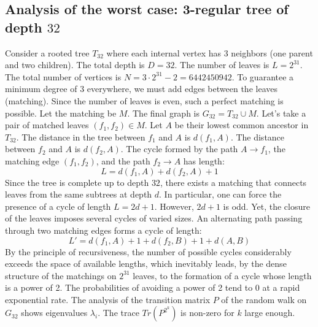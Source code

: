 \documentclass[12pt,a4paper]{article}
\begin{document}
\subsection{Analysis of the worst case: 3-regular tree of depth $32$}
Consider a rooted tree $T_{32}$ where each internal vertex has 3 neighbors (one parent and two children).
The total depth is $D = 32$.
The number of leaves is $L = 2^{31}$.
The total number of vertices is $N = 3 \cdot 2^{31} - 2 = 6442450942$.
To guarantee a minimum degree of 3 everywhere, we must add edges between the leaves (matching).
Since the number of leaves is even, such a perfect matching is possible.
Let the matching be $M$. The final graph is $G_{32} = T_{32} \cup M$.
Let's take a pair of matched leaves $(f_1, f_2) \in M$.
Let $A$ be their lowest common ancestor in $T_{32}$.
The distance in the tree between $f_1$ and $A$ is $d(f_1, A)$.
The distance between $f_2$ and $A$ is $d(f_2, A)$.
The cycle formed by the path $A \to f_1$, the matching edge $(f_1, f_2)$, and the path $f_2 \to A$ has length:
$$ L = d(f_1, A) + d(f_2, A) + 1 $$
Since the tree is complete up to depth $32$, there exists a matching that connects leaves from the same subtrees at depth $d$.
In particular, one can force the presence of a cycle of length $L = 2d + 1$. However, $2d+1$ is odd.
Yet, the closure of the leaves imposes several cycles of varied sizes. An alternating path passing through two matching edges forms a cycle of length:
$$ L' = d(f_1, A) + 1 + d(f_2, B) + 1 + d(A, B) $$
By the principle of recursiveness, the number of possible cycles considerably exceeds the space of available lengths, which inevitably leads, by the dense structure of the matchings on $2^{31}$ leaves, to the formation of a cycle whose length is a power of 2. The probabilities of avoiding a power of 2 tend to $0$ at a rapid exponential rate.
The analysis of the transition matrix $P$ of the random walk on $G_{32}$ shows eigenvalues $\lambda_i$. The trace $Tr(P^{2^k})$ is non-zero for $k$ large enough.
\end{document}
